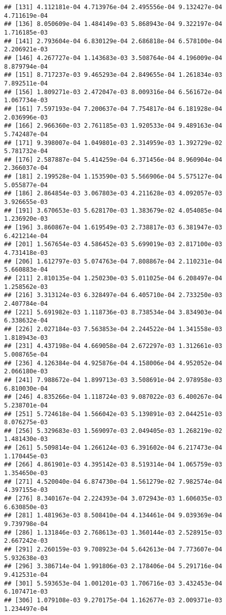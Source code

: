 \documentclass[
]{article}
\begin{document}
\begin{verbatim}
## [131] 4.112181e-04 4.713976e-04 2.495556e-04 9.132427e-04 4.711619e-04
## [136] 8.050609e-04 1.484149e-03 5.868943e-04 9.322197e-04 1.716185e-03
## [141] 2.793604e-04 6.830129e-04 2.686818e-04 6.578100e-04 2.206921e-03
## [146] 4.267727e-04 1.143683e-03 3.508764e-04 4.196009e-04 8.879794e-04
## [151] 8.717237e-03 9.465293e-04 2.849655e-04 1.261834e-03 7.892511e-04
## [156] 1.809271e-03 2.472047e-03 8.009316e-04 6.561672e-04 1.067734e-03
## [161] 7.597193e-04 7.200637e-04 7.754817e-04 6.181928e-04 2.036996e-03
## [166] 2.966360e-03 2.761185e-03 1.920533e-04 9.489163e-04 5.742487e-04
## [171] 9.398007e-04 1.049801e-03 2.314959e-03 1.392729e-02 5.781732e-04
## [176] 2.587887e-04 5.414259e-04 6.371456e-04 8.960904e-04 2.366037e-04
## [181] 2.199528e-04 1.153590e-03 5.566906e-04 5.575127e-04 5.055877e-04
## [186] 2.864854e-03 3.067803e-03 4.211628e-03 4.092057e-03 3.926655e-03
## [191] 3.670653e-03 5.628170e-03 1.383679e-02 4.054085e-04 1.236920e-03
## [196] 3.860867e-04 1.619549e-03 2.738817e-03 6.381947e-03 6.421214e-04
## [201] 1.567654e-03 4.586452e-03 5.699019e-03 2.817100e-03 4.731418e-03
## [206] 1.612797e-03 5.074763e-04 7.808867e-04 2.110231e-04 5.660883e-04
## [211] 2.810135e-04 1.250230e-03 5.011025e-04 6.208497e-04 1.258562e-03
## [216] 3.313124e-03 6.328497e-04 6.405710e-04 2.733250e-03 2.407784e-04
## [221] 5.691982e-03 1.118736e-03 8.738534e-04 3.834903e-04 6.338632e-04
## [226] 2.027184e-03 7.563853e-04 2.244522e-04 1.341558e-03 1.818943e-03
## [231] 4.437198e-04 4.669058e-04 2.672297e-03 1.312661e-03 5.008765e-04
## [236] 4.126384e-04 4.925876e-04 4.158006e-04 4.952052e-04 2.066180e-03
## [241] 7.988672e-04 1.899713e-03 3.508691e-04 2.978958e-03 6.810030e-04
## [246] 4.835266e-04 1.118724e-03 9.087022e-03 6.400267e-04 5.238701e-04
## [251] 5.724618e-04 1.566042e-03 5.139891e-03 2.044251e-03 8.076275e-03
## [256] 5.329683e-03 1.569097e-03 2.049405e-03 1.268219e-02 1.481430e-03
## [261] 5.509814e-04 1.266124e-03 6.391602e-04 6.217473e-04 1.170445e-03
## [266] 4.861901e-03 4.395142e-03 8.519314e-04 1.065759e-03 1.354650e-03
## [271] 4.520040e-04 6.874730e-04 1.561279e-02 7.982574e-04 4.397155e-03
## [276] 8.340167e-04 2.224393e-04 3.072943e-03 1.606035e-03 6.630850e-03
## [281] 1.481963e-03 8.508410e-04 4.134461e-04 9.039369e-04 9.739798e-04
## [286] 1.131846e-03 2.768613e-03 1.360144e-03 2.528915e-03 2.667242e-03
## [291] 2.260159e-03 9.708923e-04 5.642613e-04 7.773607e-04 5.932638e-03
## [296] 3.386714e-04 1.991806e-03 2.178406e-04 5.291716e-04 9.412531e-04
## [301] 5.593653e-04 1.001201e-03 1.706716e-03 3.432453e-04 6.107471e-03
## [306] 1.079108e-03 9.270175e-04 1.162677e-03 2.009371e-03 1.234497e-04

\end{verbatim}
\end{document}

